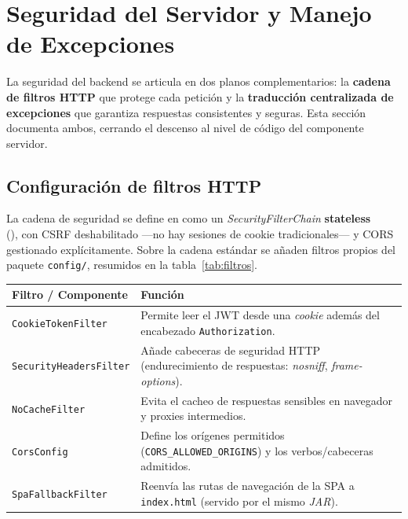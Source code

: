 \section{Seguridad del Servidor y Manejo de Excepciones}
\label{sec:excepciones}

La seguridad del backend se articula en dos planos complementarios: la \textbf{cadena de
filtros HTTP} que protege cada petición y la \textbf{traducción centralizada de
excepciones} que garantiza respuestas consistentes y seguras. Esta sección documenta
ambos, cerrando el descenso al nivel de código del componente servidor.

\subsection{Configuración de filtros HTTP}
\label{subsec:filtros}

La cadena de seguridad se define en  como un
\textit{SecurityFilterChain} \textbf{stateless} \\
(), con CSRF deshabilitado —no hay sesiones de
cookie tradicionales— y CORS gestionado explícitamente. Sobre la cadena estándar se
añaden filtros propios del paquete \texttt{config/}, resumidos en la
tabla~\ref{tab:filtros}.

\vspace{0.2cm}
\noindent
\renewcommand{\arraystretch}{1.3}
\fontsize{8.5}{10.2}\selectfont\sffamily
\begin{tabularx}{\textwidth}{|L{4.0cm}|Y|}
\hline
{}
\sffamily\textbf{Filtro / Componente} & \sffamily\textbf{Función} \\
\hline
\texttt{CookieTokenFilter} & Permite leer el JWT desde una \textit{cookie} además del encabezado \texttt{Authorization}. \\
\hline
{}
\texttt{SecurityHeadersFilter} & Añade cabeceras de seguridad HTTP (endurecimiento de respuestas: \textit{nosniff}, \textit{frame-options}). \\
\hline
\texttt{NoCacheFilter} & Evita el cacheo de respuestas sensibles en navegador y proxies intermedios. \\
\hline
{}
\texttt{CorsConfig} & Define los orígenes permitidos (\texttt{CORS\_ALLOWED\_ORIGINS}) y los verbos/cabeceras admitidos. \\
\hline
\texttt{SpaFallbackFilter} & Reenvía las rutas de navegación de la SPA a \texttt{index.html} (servido por el mismo \textit{JAR}). \\
\hline
\end{tabularx}
\label{tab:filtros}

